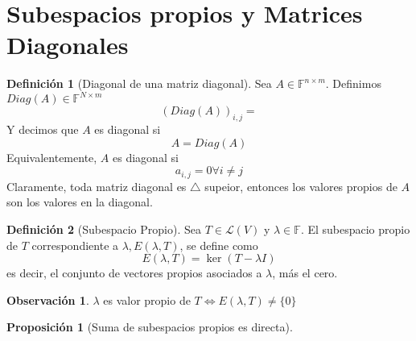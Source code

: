 \documentclass[11pt]{book}
\newcommand{\set}[1]{\mathbb{#1}}
\newtheorem{prop}[thm]{Proposición}
\theoremstyle{definition}
\newtheorem{defn}{Definición}[section]
\newtheorem{obs}{Observación}[section]
\begin{document}
\section{Subespacios propios y Matrices Diagonales}
\begin{defn}[Diagonal de una matriz diagonal]
	Sea $A\in\set{F}^{n\times m}$. Definimos $Diag(A)\in\set{F}^{N\times m}$
	\[(Diag(A))_{i,j}=\]
	Y decimos que $A$ es diagonal si
	\[A=Diag(A)\]
	Equivalentemente, $A$ es diagonal si 
	\[a_{i,j}=0\forall i\neq j\]
	Claramente, toda matriz diagonal es $\triangle$ supeior, entonces los valores propios de $A$ son los valores en la diagonal.	
\end{defn}
\begin{defn}[Subespacio Propio]
	Sea $T\in\mathcal{L}(V)$ y $\lambda\in\set{F}$. El subespacio propio de $T$ correspondiente a $\lambda, E(\lambda,T)$, se define como
	\[E(\lambda,T)=\ker (T-\lambda I)\]
	es decir, el conjunto de vectores propios asociados a $\lambda$, más el cero.
	\begin{obs}
		$\lambda$ es valor propio de $T\iff E(\lambda, T)\neq \{0\}$
	\end{obs}
\end{defn}
\begin{prop}[Suma de subespacios propios es directa]
	
\end{prop}
\end{document}
